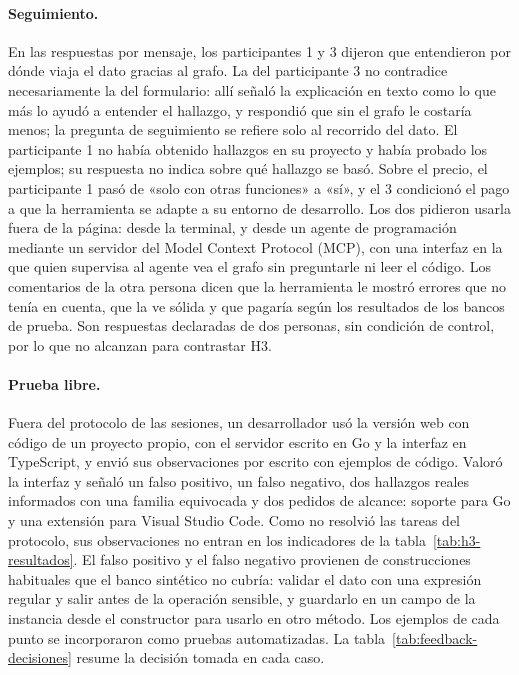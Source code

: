\paragraph{Seguimiento.} En las respuestas por mensaje, los
participantes 1 y 3 dijeron que entendieron por dónde viaja el dato
gracias al grafo. La del participante 3 no contradice necesariamente la
del formulario: allí señaló la explicación en texto como lo que más lo
ayudó a entender el hallazgo, y respondió que sin el grafo le costaría
menos; la pregunta de seguimiento se refiere solo al recorrido del dato.
El participante 1 no había obtenido hallazgos en su proyecto y había
probado los ejemplos; su respuesta no indica sobre qué hallazgo se basó.
Sobre el precio, el participante 1 pasó de «solo con otras funciones» a
«sí», y el 3 condicionó el pago a que la herramienta se adapte a su
entorno de desarrollo. Los dos pidieron usarla fuera de la página: desde
la terminal, y desde un agente de programación mediante un servidor del
Model Context Protocol (MCP), con una interfaz en la que quien supervisa
al agente vea el grafo sin preguntarle ni leer el código. Los comentarios
de la otra persona dicen que la herramienta le mostró errores que no
tenía en cuenta, que la ve sólida y que pagaría según los resultados de
los bancos de prueba. Son respuestas declaradas de dos personas, sin
condición de control, por lo que no alcanzan para contrastar H3.

\paragraph{Prueba libre.} Fuera del protocolo de las sesiones, un
desarrollador usó la versión web con código de un proyecto propio, con
el servidor escrito en Go y la interfaz en TypeScript, y envió sus
observaciones por escrito con ejemplos de código. Valoró la interfaz y
señaló un falso positivo, un falso negativo, dos hallazgos reales
informados con una familia equivocada y dos pedidos de alcance: soporte
para Go y una extensión para Visual Studio Code. Como no resolvió las
tareas del protocolo, sus observaciones no entran en los indicadores de
la tabla~\ref{tab:h3-resultados}. El falso positivo y el falso negativo
provienen de construcciones habituales que el banco sintético no
cubría: validar el dato con una expresión regular y salir antes de la
operación sensible, y guardarlo en un campo de la instancia desde el
constructor para usarlo en otro método. Los ejemplos de cada punto se
incorporaron como pruebas automatizadas. La
tabla~\ref{tab:feedback-decisiones} resume la decisión tomada en cada
caso.

